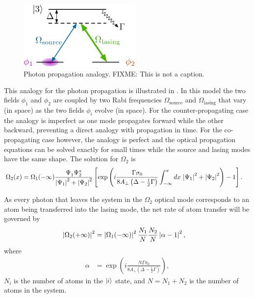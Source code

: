 \begin{figure}
    \centering
    \includegraphics[width=6cm]{DualModel}
    \caption{Photon propagation analogy. FIXME: This is not a caption.}
    \label{OpticalPumping:DualModel}
\end{figure}

This analogy for the photon propagation is illustrated in .  In this model the two fields $\phi_1$ and $\phi_2$ are coupled by two Rabi frequencies $\Omega_\text{source}$ and $\Omega_\text{lasing}$ that vary (in space) as the two fields $\phi_i$ evolve (in space).  For the counter-propagating case the analogy is imperfect as one mode propagates forward while the other backward, preventing a direct analogy with propagation in time.  For the co-propagating case however, the analogy is perfect and the optical propagation equations can be solved exactly for small times while the source and lasing modes have the same shape.  The solution for $\Omega_2$ is
\begin{align}
    \Omega_2(x) &= \Omega_1(-\infty) \frac{\Psi_1^{\phantom{*}} \Psi_2^*}{\left|\Psi_1\right|^2 + \left|\Psi_2\right|^2} \left[\exp \left( i \frac{\Gamma \sigma_0}{8 A_\perp\left(\Delta - \frac{i}{2} \Gamma\right)}\int_{-\infty}^x dx\, \left|\Psi_1\right|^2 + \left|\Psi_2\right|^2\right) -1 \right].
\end{align}

As every photon that leaves the system in the $\Omega_2$ optical mode corresponds to an atom being transferred into the lasing mode, the net rate of atom transfer will be governed by
\begin{align}
    \abs{\Omega_2(+\infty)}^2 &= \abs{\Omega_1(-\infty)}^2 \frac{N_1}{N} \frac{N_2}{N} \abs{\alpha - 1}^2, \label{OpticalPumping:OverlappingCondensates:Omega2Infinity}
\end{align}
where
\begin{align}
    \alpha &= \exp \left( i \frac{N\Gamma \sigma_0}{8 A_\perp\left(\Delta - \frac{i}{2} \Gamma\right)}\right),
\end{align}
$N_i$ is the number of atoms in the ${\left|i\right>}$ state, and $N = N_1 + N_2$ is the number of atoms in the system.  

